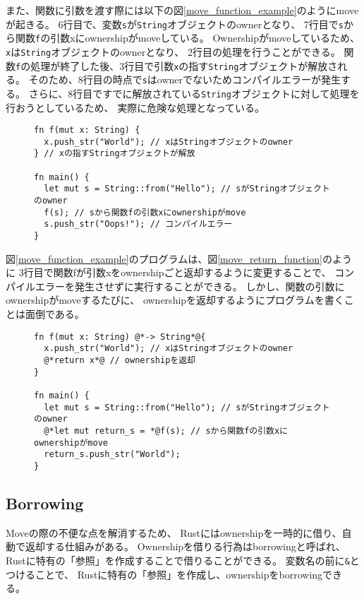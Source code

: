 \documentclass{sumiilab-paper}
\theoremstyle{mystyle}
\numberwithin{definition}{chapter} %
\begin{document}
また、関数に引数を渡す際には以下の図\ref{move_function_example}のようにmoveが起きる。
6行目で、変数\texttt{s}が\texttt{String}オブジェクトのownerとなり、
7行目で\texttt{s}から関数\texttt{f}の引数xにownershipがmoveしている。
Ownershipがmoveしているため、\texttt{x}は\texttt{String}オブジェクトのownerとなり、
2行目の処理を行うことができる。
関数\texttt{f}の処理が終了した後、3行目で引数\texttt{x}の指す\texttt{String}オブジェクトが解放される。
そのため、8行目の時点で\texttt{s}はownerでないためコンパイルエラーが発生する。
さらに、8行目ですでに解放されている\texttt{String}オブジェクトに対して処理を行おうとしているため、
実際に危険な処理となっている。
\begin{figure}[htp]
\begin{lstlisting}[caption=関数に引数を渡す際にmoveが起こる例, 
label=move_function_example, captionpos=b]
fn f(mut x: String) {
  x.push_str("World"); // xはStringオブジェクトのowner
} // xの指すStringオブジェクトが解放

fn main() {
  let mut s = String::from("Hello"); // sがStringオブジェクトのowner
  f(s); // sから関数fの引数xにownershipがmove
  s.push_str("Oops!"); // コンパイルエラー
}
\end{lstlisting}
\end{figure}

図\ref{move_function_example}のプログラムは、図\ref{move_return_function}のように
3行目で関数fが引数xをownershipごと返却するように変更することで、
コンパイルエラーを発生させずに実行することができる。
しかし、関数の引数にownershipがmoveするたびに、
ownershipを返却するようにプログラムを書くことは面倒である。
\afterpage{\clearpage}
\newpage

\begin{figure}[htp]
\begin{lstlisting}[caption=Ownershipを返却する例, 
  label=move_return_function, captionpos=b]
fn f(mut x: String) @*-> String*@{
  x.push_str("World"); // xはStringオブジェクトのowner
  @*return x*@ // ownershipを返却
}
  
fn main() {
  let mut s = String::from("Hello"); // sがStringオブジェクトのowner
  @*let mut return_s = *@f(s); // sから関数fの引数xにownershipがmove
  return_s.push_str("World");
}
\end{lstlisting}
\end{figure}

\subsection{Borrowing}
Moveの際の不便な点を解消するため、
Rustにはownershipを一時的に借り、自動で返却する仕組みがある。
Ownershipを借りる行為はborrowingと呼ばれ、
Rustに特有の「参照」を作成することで借りることができる。
変数名の前に\texttt{\&}とつけることで、
Rustに特有の「参照」を作成し、ownershipをborrowingできる。
\end{document}
